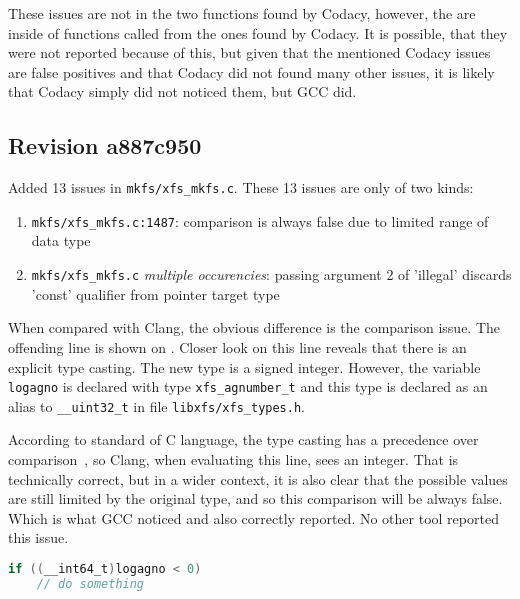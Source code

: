These issues are not in the two functions found by Codacy, however, the are
inside of functions called from the ones found by Codacy. It is possible,
that they were not reported because of this, but given that the mentioned
Codacy issues are false positives and that Codacy did not found many other
issues, it is likely that Codacy simply did not noticed them, but GCC did.

\subsection{Revision a887c950}\label{chap:results:gcc:a887c950}
Added 13 issues in {\tt mkfs/xfs\_mkfs.c}. These 13 issues are only of two
kinds:

\begin{enumerate}
	\item {\tt mkfs/xfs\_mkfs.c:1487}: comparison is always false due
		to limited range of data type
	\item {\tt mkfs/xfs\_mkfs.c} {\em multiple occurencies}: passing
		argument 2 of 'illegal' discards 'const' qualifier from
		pointer target type
\end{enumerate}

When compared with Clang, the obvious difference is the comparison issue.
The offending line is shown on . Closer
look on this line reveals that there is an explicit type casting. The new
type is a signed integer. However, the variable {\tt logagno} is declared
with type {\tt xfs\_agnumber\_t} and this type is declared as an alias to
{\tt \_\_uint32\_t} in file {\tt libxfs/xfs\_types.h}.

According to standard of C language, the type casting has a precedence over
comparison~\cite[A.2.1]{ISO9899}, so Clang, when evaluating this line, sees
an integer. That is technically correct, but in a wider context, it is also
clear that the possible values are still limited by the original type, and
so this comparison will be always false.  Which is what GCC noticed and
also correctly reported. No other tool reported this issue.


\begin{lstlisting}[frame=none, basicstyle=\footnotesize\ttfamily,
language=C, numbers=none, numberstyle=\tiny\color{black},caption=
{Line on which GCC found the comparison issue.},
label={lst:results:logagnoComparison}]
if ((__int64_t)logagno < 0)
	// do something
\end{lstlisting}

